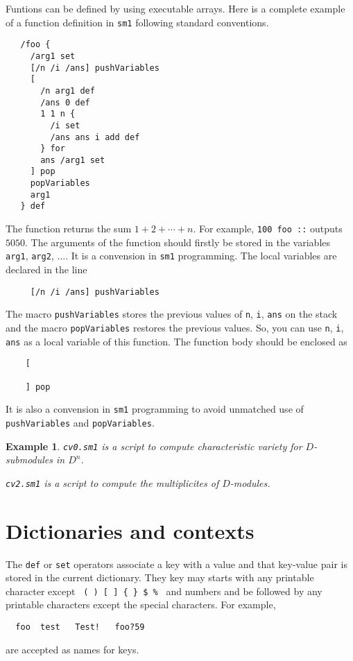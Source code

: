 \documentclass{article}
\newtheorem{example}{Example}
\begin{document}
Funtions can be defined by using executable arrays.
Here is a complete example of a function definition in {\tt sm1}
following standard conventions.
\begin{verbatim}
   /foo {
     /arg1 set
     [/n /i /ans] pushVariables
     [
       /n arg1 def
       /ans 0 def
       1 1 n {
         /i set
         /ans ans i add def
       } for
       ans /arg1 set
     ] pop
     popVariables
     arg1
   } def
\end{verbatim}
The function returns the sum $1+2+\cdots+ n$.
For example, 
{\tt 100 foo ::} outputs $5050$.
The arguments of the function should firstly be stored in the variables
{\tt arg1}, {\tt arg2}, $\ldots$.
It is a convension in {\tt sm1} programming.
The local variables are declared in the line
\begin{verbatim}
     [/n /i /ans] pushVariables
\end{verbatim}
The macro {\tt pushVariables} stores the previous values of
{\tt n}, {\tt i}, {\tt ans} on the stack and
the macro {\tt popVariables} restores the previous values.
So, you can use {\tt n}, {\tt i}, {\tt ans}
as a local variable of this function.
The function body should be enclosed as
\begin{verbatim}
    [

    ] pop
\end{verbatim}
It is also a convension in {\tt sm1} programming
to avoid unmatched use of
{\tt pushVariables} and {\tt popVariables}.


\begin{example} \rm
{\tt cv0.sm1} is a script to compute characteristic variety
for $D$-submodules in $D^n$.

{\tt cv2.sm1} is a script to compute the multiplicites of
$D$-modules.
\end{example}


\section{Dictionaries and contexts}

The {\tt def} or {\tt set} operators associate a key with a value
and that key-value pair is stored in the current dictionary.
They key may starts with any printable character except
\verb+ ( ) [ ] { } $ % +
and numbers and be followed by any printable characters
except the special characters.
For example,
\begin{verbatim}
  foo  test   Test!   foo?59
\end{verbatim}
are accepted as names for keys.
\end{document}
